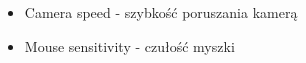 \begin{itemize}
\item Camera speed - szybkość poruszania kamerą
\item Mouse sensitivity - czułość myszki
\end{itemize}

%
%
%
%
%


